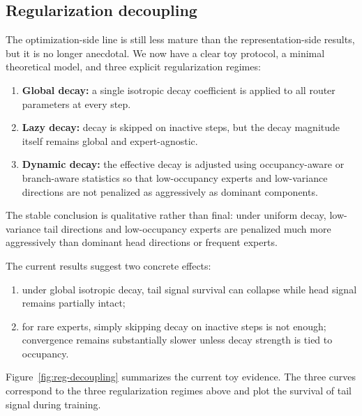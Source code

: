 \documentclass[11pt]{article}
\begin{document}
\subsection{Regularization decoupling}

The optimization-side line is still less mature than the representation-side results, but it is no longer anecdotal. We now have a clear toy protocol, a minimal theoretical model, and three explicit regularization regimes:
\begin{enumerate}[leftmargin=1.5em]
    \item \textbf{Global decay:} a single isotropic decay coefficient is applied to all router parameters at every step.
    \item \textbf{Lazy decay:} decay is skipped on inactive steps, but the decay magnitude itself remains global and expert-agnostic.
    \item \textbf{Dynamic decay:} the effective decay is adjusted using occupancy-aware or branch-aware statistics so that low-occupancy experts and low-variance directions are not penalized as aggressively as dominant components.
\end{enumerate}

The stable conclusion is qualitative rather than final: under uniform decay, low-variance tail directions and low-occupancy experts are penalized much more aggressively than dominant head directions or frequent experts.

The current results suggest two concrete effects:
\begin{enumerate}[leftmargin=1.5em]
    \item under global isotropic decay, tail signal survival can collapse while head signal remains partially intact;
    \item for rare experts, simply skipping decay on inactive steps is not enough; convergence remains substantially slower unless decay strength is tied to occupancy.
\end{enumerate}

Figure~\ref{fig:reg-decoupling} summarizes the current toy evidence. The three curves correspond to the three regularization regimes above and plot the survival of tail signal during training.
\end{document}
